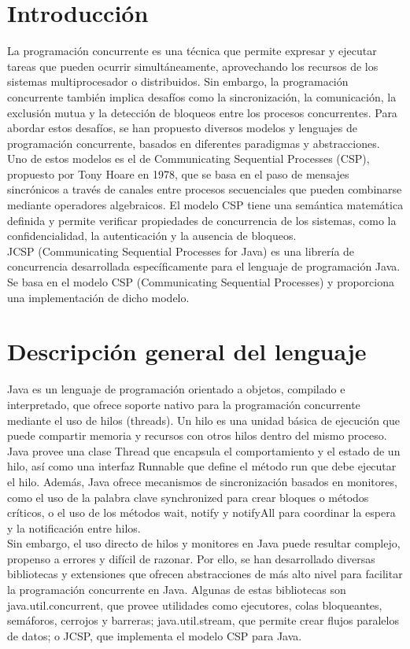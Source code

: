 \section*{Introducción}

La programación concurrente es una técnica que permite expresar y ejecutar tareas que pueden ocurrir simultáneamente, aprovechando los recursos de los sistemas multiprocesador o distribuidos. Sin embargo, la programación concurrente también implica desafíos como la sincronización, la comunicación, la exclusión mutua y la detección de bloqueos entre los procesos concurrentes. Para abordar estos desafíos, se han propuesto diversos modelos y lenguajes de programación concurrente, basados en diferentes paradigmas y abstracciones.\\
Uno de estos modelos es el de Communicating Sequential Processes (CSP), propuesto por Tony Hoare en 1978, que se basa en el paso de mensajes sincrónicos a través de canales entre procesos secuenciales que pueden combinarse mediante operadores algebraicos. El modelo CSP tiene una semántica matemática definida y permite verificar propiedades de concurrencia de los sistemas, como la confidencialidad, la autenticación y la ausencia de bloqueos.\\
JCSP (Communicating Sequential Processes for Java) es una librería de concurrencia desarrollada específicamente para el lenguaje de programación Java. Se basa en el modelo CSP (Communicating Sequential Processes) y proporciona una implementación de dicho modelo.

\section*{Descripción general del lenguaje}
Java es un lenguaje de programación orientado a objetos, compilado e interpretado, que ofrece soporte nativo para la programación concurrente mediante el uso de hilos (threads). Un hilo es una unidad básica de ejecución que puede compartir memoria y recursos con otros hilos dentro del mismo proceso. Java provee una clase Thread que encapsula el comportamiento y el estado de un hilo, así como una interfaz Runnable que define el método run que debe ejecutar el hilo. Además, Java ofrece mecanismos de sincronización basados en monitores, como el uso de la palabra clave synchronized para crear bloques o métodos críticos, o el uso de los métodos wait, notify y notifyAll para coordinar la espera y la notificación entre hilos.\\
Sin embargo, el uso directo de hilos y monitores en Java puede resultar complejo, propenso a errores y difícil de razonar. Por ello, se han desarrollado diversas bibliotecas y extensiones que ofrecen abstracciones de más alto nivel para facilitar la programación concurrente en Java. Algunas de estas bibliotecas son java.util.concurrent, que provee utilidades como ejecutores, colas bloqueantes, semáforos, cerrojos y barreras; java.util.stream, que permite crear flujos paralelos de datos; o JCSP, que implementa el modelo CSP para Java.

